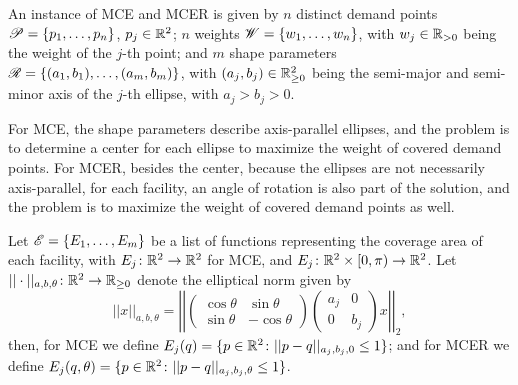 


An instance of MCE and MCER is given by $n$ distinct demand points $\mathscr{P}=\{p_1, \dots, p_n\}$, $p_j\in\mathbb{R}^2$; $n$ weights $\mathscr{W}=\{w_1, \dots, w_n\}$, with $w_j\in\mathbb{R}_{>0}$ being the weight of the $j$-th point; and $m$ shape parameters $\mathscr{R}=\{(a_1, b_1), \dots, (a_m, b_m)\}$, with $(a_j, b_j)\in\mathbb{R}_{\ge0}^2$ being the semi-major and semi-minor axis of the $j$-th ellipse, with $a_j > b_j > 0$.

For MCE, the shape parameters describe axis-parallel ellipses, and the problem is to determine a center for each ellipse to maximize the weight of covered demand points. For MCER, besides the center, because the ellipses are not necessarily axis-parallel, for each facility, an angle of rotation is also part of the solution, and the problem is to maximize the weight of covered demand points as well.

Let $\mathscr{E}=\{E_1, \dots, E_m\}$ be a list of functions representing the coverage area of each facility, with $E_j \colon \mathbb{R}^2 \to \mathbb{R}^2$ for MCE, and $E_j \colon \mathbb{R}^2\times [0, \pi)\to \mathbb{R}^2$. Let $||\cdot||_{a,b, \theta} \colon \mathbb{R}^2 \to \mathbb{R}_{\ge0}$ denote the elliptical norm given by
\begin{equation*}
||x||_{a,b, \theta}=\left|\left|
\left(\begin{array}{rr}
\cos{\theta} & \sin{\theta}\\
\sin{\theta} & -\cos{\theta}
\end{array}
\right)
\left(\begin{array}{cc}
a_j & 0\\
0 & b_j
\end{array}\right) x \right|\right|_2,
\end{equation*}
then, for MCE we define $E_j(q)=\{p \in \mathbb{R}^2 \colon ||p-q||_{a_j,b_j,0} \le 1\}$; and for MCER we define $E_j(q, \theta)=\{p \in \mathbb{R}^2 \colon ||p-q||_{a_j,b_j, \theta} \le 1\}$.

